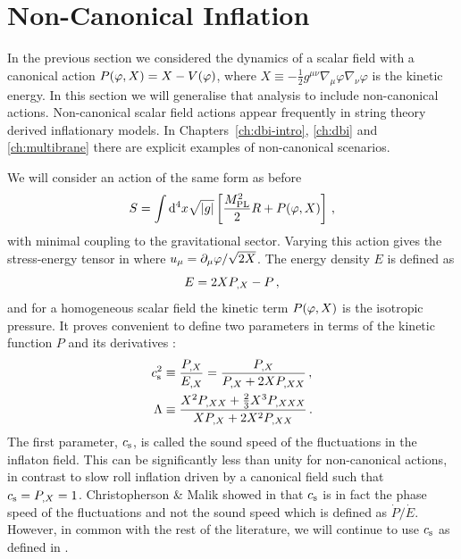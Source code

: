 \section{Non-Canonical Inflation} 
\label{sec:noncanoninfl}

In the previous section we considered the dynamics of a scalar field with a
canonical action $P(\varphi, X) = X - V(\varphi)$, where $X \equiv -\frac{1}{2}g^{\mu
\nu}\nabla_\mu \varphi \nabla_\nu \varphi$ is the kinetic energy. 
In this
section we will generalise
that analysis to include non-canonical actions. Non-canonical scalar
field actions appear frequently in string theory derived inflationary models.
In Chapters~\ref{ch:dbi-intro}, \ref{ch:dbi} and \ref{ch:multibrane}
there are explicit examples of non-canonical scenarios.

We will consider an action of the same form as before
% 
\begin{equation}
\label{eq:DBIaction-dbiintro2}
S=\int  \mathrm{d}^4x \sqrt{|g|} \left[ \frac{M_{\mathrm{PL}}^2}{2} R 
+ P (\varphi , X) \right] \,,
\end{equation}
% 
with minimal coupling to the gravitational sector. Varying this action gives the
stress-energy tensor in
 where $u_\mu = \partial_\mu\varphi/\sqrt{2X}$. 
The energy density $E$ is defined as
\begin{equation}
 E = 2XP_{,X} - P\,,
\end{equation}
% 
and for a homogeneous scalar field the kinetic term $P(\varphi, X)$ is the
isotropic pressure. 
It proves convenient to define two parameters in terms of the 
kinetic function $P$ and its derivatives \cite{lidser1,lidser3}: 
% 
\begin{align}
\label{eq:defcs-dbiintro}
 c_\mathrm{s}^2 &\equiv \frac{P_{,X}}{E_{,X}} =  \frac{P_{,X}}{P_{,X} + 2X P_{,XX}} \,,
\\
\label{eq:deflambda-dbiintro}
\Lambda &\equiv  \frac{X^2 P_{,XX} +
\frac{2}{3}X^3 P_{,XXX}}{X P_{,X} +
2X^2 P_{,XX}}\,.
\end{align}
% 
The first parameter, $c_\mathrm{s}$, is called the sound speed of the fluctuations
in the inflaton field. This can be significantly less than unity for non-canonical
actions, 
in contrast to slow roll inflation driven by a canonical 
field such that $c_\mathrm{s} = P_{,X} =1$.
% 
Christopherson \& Malik showed in  that $c_\mathrm{s}$
is in fact the phase speed of the fluctuations and not the sound speed
which is defined as $\dot{P}/\dot{E}$. However, in common with the rest of the
literature, we will continue to use $c_\mathrm{s}$ as defined in . 

